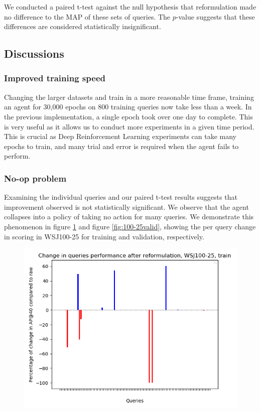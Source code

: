 We conducted a paired t-test against the null hypothesis that reformulation made no difference to the MAP of these sets of queries. The $p$-value suggests that these differences are considered statistically insignificant. 



\subsection{Discussions}


\subsubsection{Improved training speed}
Changing the  larger datasets and train in a more reasonable time frame, training an agent for 30,000 epochs on 800 training queries now take less than a week. In the previous implementation, a single epoch took over one day to complete. This is very useful as it allows us to conduct more experiments in a given time period. This is crucial as Deep Reinforcement Learning experiments can take many epochs to train, and many trial and error is required when the agent fails to perform.



\subsubsection{No-op problem}

Examining the individual queries and our paired t-test results suggests that improvement observed is not statistically significant. We observe that the agent collapses into a policy of taking no action for many queries. We demonstrate this phenomenon in figure \ref{fig:100-25train}  and figure \ref{fig:100-25valid}, showing the per query change in scoring in WSJ100-25 for training and validation, respectively.  

\begin{figure}[H]
	\centering
	\includegraphics[width=0.7\linewidth]{images/chapter_4/second_system/100-25_train}
	\caption{}
	\label{fig:100-25train}
\end{figure}


